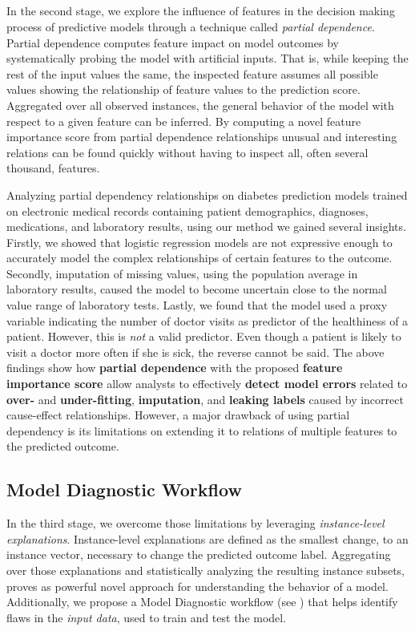 \subsection{\emph{\prospector}}
In the second stage, we explore the influence of features in the decision making process of predictive models through a technique called \emph{partial dependence}. Partial dependence computes feature impact on model outcomes by systematically probing the model with artificial inputs. That is, while keeping the rest of the input values the same, the inspected feature assumes all possible values showing the relationship of feature values to the prediction score. Aggregated over all observed instances, the general behavior of the model with respect to a given feature can be inferred. By computing a novel feature importance score from partial dependence relationships unusual and interesting relations can be found quickly without having to inspect all, often several thousand, features.

Analyzing partial dependency relationships on diabetes prediction models trained on electronic medical records containing patient demographics, diagnoses, medications, and laboratory results, using our method we gained several insights. Firstly, we showed that logistic regression models are not expressive enough to accurately model the complex relationships of certain features to the outcome. Secondly, imputation of missing values, using the population average in laboratory results, caused the model to become uncertain close to the normal value range of laboratory tests. Lastly, we found that the model used a proxy variable indicating the number of doctor visits as predictor of the healthiness of a patient.
However, this is \emph{not} a valid predictor.
Even though a patient is likely to visit a doctor more often if she is sick, the reverse cannot be said. The above findings show how \textbf{partial dependence} with the proposed \textbf{feature importance score} allow analysts to effectively \textbf{detect model errors} related to \textbf{over-} and \textbf{under-fitting}, \textbf{imputation}, and \textbf{leaking labels} caused by incorrect cause-effect relationships.
However, a major drawback of using partial dependency is its limitations on extending it to relations of multiple features to the predicted outcome.



\subsection{Model Diagnostic Workflow}
In the third stage, we overcome those limitations by leveraging \emph{instance-level explanations}. Instance-level explanations are defined as the smallest change, to an instance vector, necessary to change the predicted outcome label. Aggregating over those explanations and statistically analyzing the resulting instance subsets, proves as powerful novel approach for understanding the behavior of a model. Additionally, we propose a Model Diagnostic workflow (see ) that helps identify flaws in the \emph{input data}, used to train and test the model.

